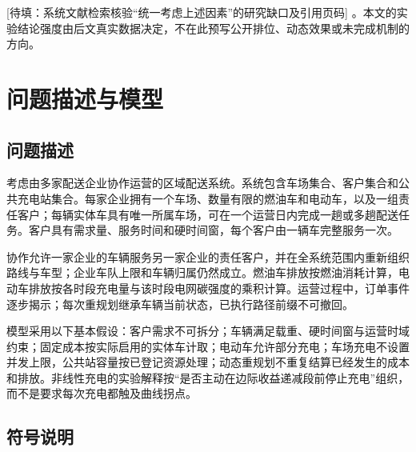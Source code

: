 \documentclass{setp-new}
\DeclareRobustCommand{\TBD}[1]{%
  \begingroup\setlength{\fboxsep}{1.2pt}%
  \colorbox{black!12}{\textcolor{black!65}{\textsf{\footnotesize[待填：#1]}}}%
  \endgroup}
\begin{document}
\TBD{系统文献检索核验“统一考虑上述因素”的研究缺口及引用页码}。本文的实验结论强度由后文真实数据决定，不在此预写公开排位、动态效果或未完成机制的方向。

\section{问题描述与模型}

\subsection{问题描述}

考虑由多家配送企业协作运营的区域配送系统。系统包含车场集合、客户集合和公共充电站集合。每家企业拥有一个车场、数量有限的燃油车和电动车，以及一组责任客户；每辆实体车具有唯一所属车场，可在一个运营日内完成一趟或多趟配送任务。客户具有需求量、服务时间和硬时间窗，每个客户由一辆车完整服务一次。

协作允许一家企业的车辆服务另一家企业的责任客户，并在全系统范围内重新组织路线与车型；企业车队上限和车辆归属仍然成立。燃油车排放按燃油消耗计算，电动车排放按各时段充电量与该时段电网碳强度的乘积计算。运营过程中，订单事件逐步揭示；每次重规划继承车辆当前状态，已执行路径前缀不可撤回。

模型采用以下基本假设：客户需求不可拆分；车辆满足载重、硬时间窗与运营时域约束；固定成本按实际启用的实体车计取；电动车允许部分充电；车场充电不设置并发上限，公共站容量按已登记资源处理；动态重规划不重复结算已经发生的成本和排放。非线性充电的实验解释按“是否主动在边际收益递减段前停止充电”组织，而不是要求每次充电都触及曲线拐点。

\subsection{符号说明}
\end{document}
